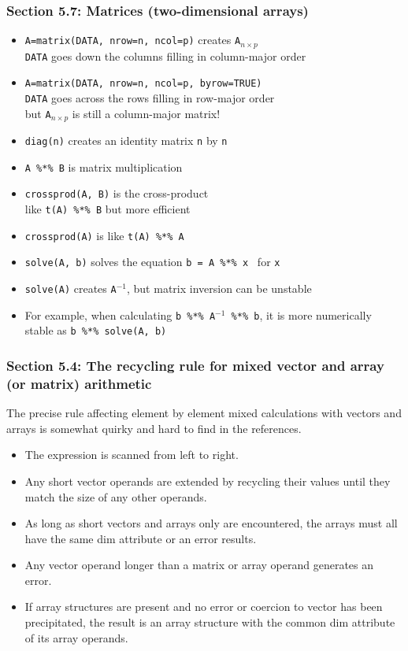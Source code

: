 \documentclass[11pt,pdftex,dvipsnames,usenames,helvetica]{beamer}
\begin{document}
\begin{frame}
\frametitle{Section 5.7: Matrices (two-dimensional arrays)}

\begin{itemize}
\item {\tt A=matrix(DATA, nrow=n, ncol=p)} creates {\tt A$_{n\times p}$}\\
{\tt DATA} goes down the columns filling in column-major order
\item {\tt A=matrix(DATA, nrow=n, ncol=p, byrow=TRUE)}\\
{\tt DATA} goes across the rows filling in row-major order\\
but {\tt A$_{n\times p}$} is still a column-major matrix!
\item {\tt diag(n)} creates an identity matrix {\tt n} by {\tt n}
\item {\tt A \%*\% B} is matrix multiplication
\item {\tt crossprod(A, B)} is the cross-product\\
like {\tt t(A) \%*\% B} but more efficient
\item {\tt crossprod(A)} is like {\tt t(A) \%*\% A}
\item {\tt solve(A, b)} solves the equation {\tt b = A \%*\% x } for {\tt x}
\item {\tt solve(A)} creates {\tt A$^{-1}$}, but matrix inversion can be unstable
\item For example, when calculating {\tt b \%*\% A$^{-1}$ \%*\% b}, it is 
more numerically stable as {\tt b \%*\% solve(A, b) }
\end{itemize}

\end{frame}

\begin{frame}
\frametitle{Section 5.4: The recycling rule for mixed vector and array
  (or matrix) arithmetic} 

The precise rule affecting element by element mixed calculations with
vectors and arrays is somewhat quirky and hard to find in the
references.
\begin{itemize}
\item The expression is scanned from left to right.
\item Any short vector operands are extended by recycling their values
  until they match the size of any other operands.
\item As long as short vectors and arrays only are encountered, the
  arrays must all have the same dim attribute or an error results.
\item Any vector operand longer than a matrix or array operand
  generates an error.
\item If array structures are present and no error or coercion to
  vector has been precipitated, the result is an array structure with
  the common dim attribute of its array operands.
\end{itemize}

\end{frame}
\end{document}
